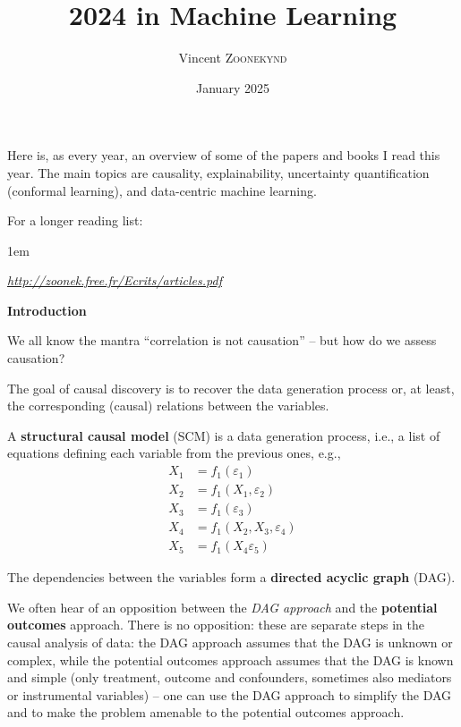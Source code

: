 \documentclass[a5paper]{article}
\title{2024 in Machine Learning}
\author{Vincent \textsc{Zoonekynd}}
\date{January 2025}
\let\epsilon\varepsilon
\let\d\textbf
\newenvironment{reference}{%
  \medskip\goodbreak
  \parskip 0pt
  \raggedright
  \leftskip 1em
  \obeylines
}{\par\medskip\goodbreak}
\def\section#1{\clearpage{\vspace*{0cm}\LARGE\centering\bfseries #1\par\bigskip\bigskip}}
\def\subsection#1{{\par\bigskip\goodbreak\large\bfseries #1\par}}
\begin{document}
\maketitle
\thispagestyle{empty}
\clearpage
\sloppy


Here is, as every year, an overview of some of the papers and books I read this year.
The main topics are causality, explainability, uncertainty quantification (conformal learning),
and data-centric machine learning.

For a longer reading list:

\begin{reference}
  \emph{\url{http://zoonek.free.fr/Ecrits/articles.pdf}}
\end{reference}

\section{Causality}

\subsection{Introduction}

We all know the mantra ``correlation is not causation'' -- but how do we assess causation?

The goal of causal discovery is to recover the data generation process or,
at least, the corresponding (causal) relations between the variables.

A \d{structural causal model} (SCM) is a data generation process, i.e.,
a list of equations defining each variable from the previous ones, e.g.,
\begin{align*}
  X_1 &= f_1(\epsilon_1) \\
  X_2 &= f_1(X_1,\epsilon_2) \\
  X_3 &= f_1(\epsilon_3) \\
  X_4 &= f_1(X_2,X_3,\epsilon_4) \\
  X_5 &= f_1(X_4\epsilon_5)
\end{align*}

The dependencies between the variables form a \d{directed acyclic graph} (DAG).

We often hear of an opposition between the \emph{DAG approach} and the \d{potential outcomes} approach.
There is no opposition: these are separate steps in the causal analysis of data:
the DAG approach assumes that the DAG is unknown or complex,
while the potential outcomes approach assumes that the DAG is known and simple
(only treatment, outcome and confounders,
sometimes also mediators or instrumental variables) --
one can use the DAG approach to simplify the DAG and to make
the problem amenable to the potential outcomes approach.
\end{document}
